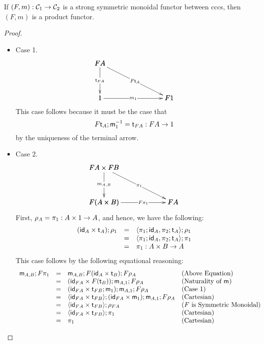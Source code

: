 \begin{lemma}
  \label{lemma:strong-symmetric_monoidal_functors_are_product_functors}
  If $(F,m) : \mathcal{C}_1 \rightarrow \mathcal{C}_2$ is a strong symmetric monoidal
  functor between cccs, then $(F,m)$ is a product functor.
\end{lemma}
\begin{proof}
  \ \\
  \begin{itemize}
  \item[] Case 1.\\
    \[
      \bfig
      \btriangle|mmm|<1000,500>[
        FA`
        1`
        F1;
        \t_{FA}`
        F\t_{A}`
        m_1]
      \efig
    \]
    This case follows because it must be the case that
    \[F\mathsf{t}_{A};\mathsf{m}_{1}^{-1} = \mathsf{t}_{FA} : FA \rightarrow 1\]
    by the uniqueness of the terminal arrow.
    
  \item[] Case 2.\\
    \[
      \bfig
      \btriangle|mmm|<1000,500>[
        FA \times FB`
        F(A \times B)`
        FA;
        m_{A,B}`
        \pi_1`
        F\pi_1]
      \efig
      \]
      First, $\rho_A = \pi_1 : A \times 1 \rightarrow A$, and hence, we have the following:
      \[
      \begin{array}{lll}
        (\mathsf{id}_A \times \mathsf{t}_A);\rho_1 & = & \langle \pi_1;\mathsf{id}_A, \pi_2;\mathsf{t}_A \rangle;\rho_1\\
        & = & \langle \pi_1;\mathsf{id}_A, \pi_2;\mathsf{t}_A \rangle;\pi_1\\
        & = & \pi_1 : A \times B \rightarrow A
      \end{array}
      \]
      This case follows by the following equational reasoning:
      \[
      \begin{array}{llllllll}
        \mathsf{m}_{A,B};F\pi_1
        & = & \mathsf{m}_{A,B};F(\mathsf{id}_A \times \mathsf{t}_B);F\rho_A & \text{(Above Equation)}\\
        & = & (\mathsf{id}_{FA} \times F(\mathsf{t}_{B}));\mathsf{m}_{A,1};F\rho_A & \text{(Naturality of $\mathsf{m}_{}$)}\\
        & = & (\mathsf{id}_{FA} \times \mathsf{t}_{FB};\mathsf{m}_{1});\mathsf{m}_{A,1};F\rho_A & \text{(Case 1)}\\
        & = & \langle \mathsf{id}_{FA} \times \mathsf{t}_{FB} \rangle;(\mathsf{id}_{FA} \times \mathsf{m}_{1});\mathsf{m}_{A,1};F\rho_A & \text{(Cartesian)}\\
        & = & \langle \mathsf{id}_{FA} \times \mathsf{t}_{FB} \rangle;\rho_{FA} & \text{($F$ is Symmetric Monoidal)}\\
        & = & \langle \mathsf{id}_{FA} \times \mathsf{t}_{FB} \rangle;\pi_1 & \text{(Cartesian)}\\
        & = & \pi_1 & \text{(Cartesian)}\\ 
      \end{array}
      \]
    

\end{itemize}
\end{proof}
